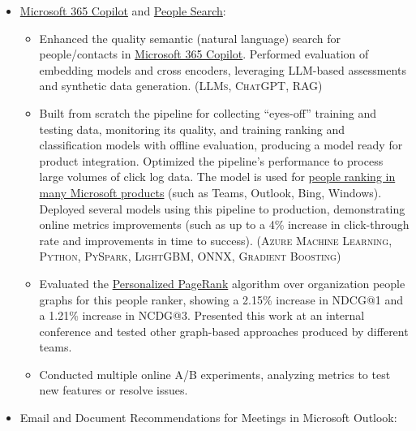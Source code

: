\documentclass{article}
\begin{document}
\begin{itemize}

\item \href{https://www.microsoft.com/en-gb/microsoft-copilot/organizations}{Microsoft 365 Copilot} and \href{https://learn.microsoft.com/en-us/graph/search-concept-person}{People Search}:

  \begin{itemize}

  \item Enhanced the quality semantic (natural language) search for people/contacts in \href{https://www.microsoft.com/en-us/microsoft-365/copilot}{Microsoft 365 Copilot}. Performed evaluation of embedding models and cross encoders, leveraging LLM-based assessments and synthetic data generation. (\textsc{LLMs}, \textsc{ChatGPT}, \textsc{RAG})

  \item Built from scratch the pipeline for collecting ``eyes-off'' training and testing data, monitoring its quality, and training ranking and classification models with offline evaluation, producing a model ready for product integration. Optimized the pipeline's performance to process large volumes of click log data. The model is used for \href{https://www.youtube.com/watch?v=a6HO4ekmmjU}{people ranking in many Microsoft products} (such as Teams, Outlook, Bing, Windows). Deployed several models using this pipeline to production, demonstrating online metrics improvements (such as up to a 4\% increase in click-through rate and improvements in time to success). (\textsc{Azure Machine Learning}, \textsc{Python}, \textsc{PySpark}, \textsc{LightGBM}, \textsc{ONNX}, \textsc{Gradient Boosting})

  \item Evaluated the \href{https://www.cs.cornell.edu/~bindel/blurbs/edgeppr.html}{Personalized PageRank} algorithm over organization people graphs for this people ranker, showing a 2.15\% increase in NDCG@1 and a 1.21\% increase in NCDG@3. Presented this work at an internal conference and tested other graph-based approaches produced by different teams.

  \item Conducted multiple online A/B experiments, analyzing metrics to test new features or resolve issues.

  \end{itemize}

\item Email and Document Recommendations for Meetings in Microsoft Outlook:


\end{itemize}
\end{document}
